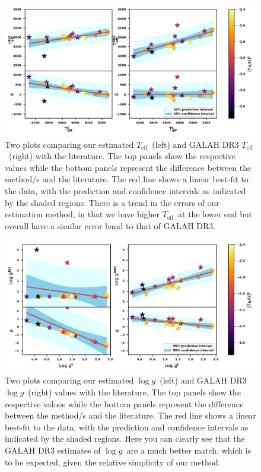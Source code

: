 \documentclass[]{aastex631}
\newcommand{\logg}{\ensuremath{\log g}\xspace}
\newcommand{\teff}{\ensuremath{T_{\mathrm{eff}}}\xspace}
\begin{document}
\begin{figure}
\includegraphics[width=\columnwidth,keepaspectratio]{Plots/Figure8.pdf}
\caption{Two plots comparing our estimated \teff \ (left) and GALAH DR3 \teff \ (right) with the literature. The top panels show the respective values while the bottom panels represent the difference between the method/s and the literature. The red line shows a linear best-fit to the data, with the prediction and confidence intervals as indicated by the shaded regions.  There is a trend in the errors of our estimation method, in that we have higher \teff \ at the lower end but overall have a similar error band to that of GALAH DR3.}
\label{fig:Tefflit}
\end{figure}


\begin{figure}
\includegraphics[width=\linewidth,keepaspectratio]{Plots/Figure9.pdf}
\caption{Two plots comparing our estimated \logg \ (left) and GALAH DR3 \logg \ (right) values with the literature. The top panels show the respective values while the bottom panels represent the difference between the method/s and the literature. The red line shows a linear best-fit to the data, with the prediction and confidence intervals as indicated by the shaded regions.  Here you can clearly see that the GALAH DR3 estimates of \logg \ are a much better match, which is to be expected, given the relative simplicity of our method. }
\label{fig:Logglit}
\end{figure}
\end{document}
